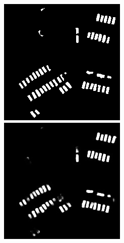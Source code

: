 \documentclass[a4paper,11pt]{article}
\begin{document}
\begin{figure}[H]
  \includegraphics[width=\linewidth]{gan_vs_class/label_2}
\endminipage\hfill
{}
  \includegraphics[width=\linewidth]{gan_vs_class/class_2}

\end{figure}
\end{document}
